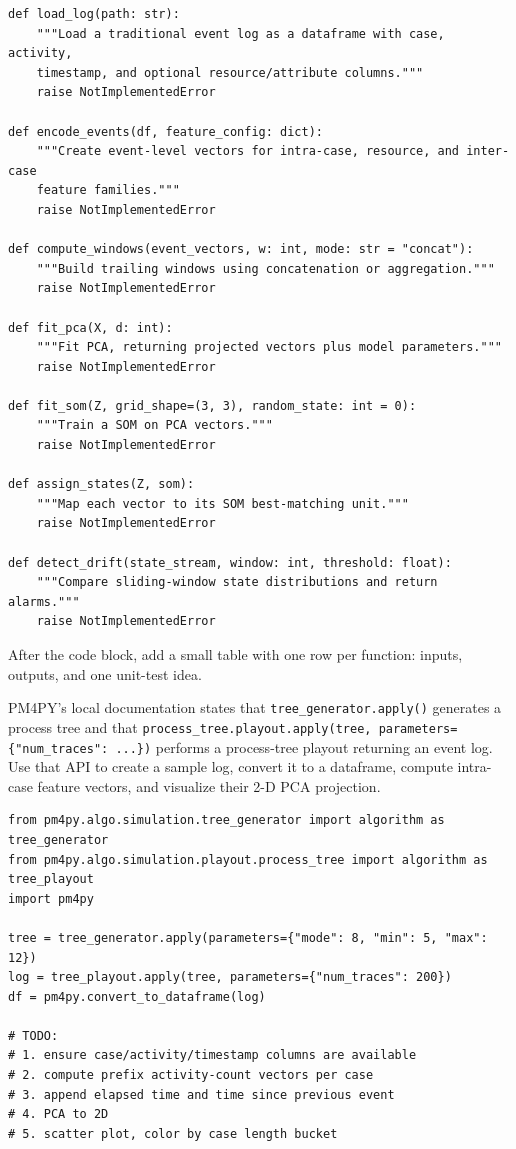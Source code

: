 \documentclass[a4paper,11pt]{article}
\newcounter{task}
\newcommand{\Task}[1]{%
  \refstepcounter{task}%
  \par\medskip
  \noindent{\large\bfseries Task \thetask: #1}\par\smallskip
}
\begin{document}
\begin{lstlisting}[style=python]
def load_log(path: str):
    """Load a traditional event log as a dataframe with case, activity,
    timestamp, and optional resource/attribute columns."""
    raise NotImplementedError

def encode_events(df, feature_config: dict):
    """Create event-level vectors for intra-case, resource, and inter-case
    feature families."""
    raise NotImplementedError

def compute_windows(event_vectors, w: int, mode: str = "concat"):
    """Build trailing windows using concatenation or aggregation."""
    raise NotImplementedError

def fit_pca(X, d: int):
    """Fit PCA, returning projected vectors plus model parameters."""
    raise NotImplementedError

def fit_som(Z, grid_shape=(3, 3), random_state: int = 0):
    """Train a SOM on PCA vectors."""
    raise NotImplementedError

def assign_states(Z, som):
    """Map each vector to its SOM best-matching unit."""
    raise NotImplementedError

def detect_drift(state_stream, window: int, threshold: float):
    """Compare sliding-window state distributions and return alarms."""
    raise NotImplementedError
\end{lstlisting}

After the code block, add a small table with one row per function: inputs, outputs, and one unit-test idea.

\Task{PM4PY intra-case PCA}
PM4PY's local documentation states that \texttt{tree\_generator.apply()} generates a process tree and that \texttt{process\_tree.playout.apply(tree, parameters=\{"num\_traces": ...\})} performs a process-tree playout returning an event log. Use that API to create a sample log, convert it to a dataframe, compute intra-case feature vectors, and visualize their 2-D PCA projection.

\begin{lstlisting}[style=python]
from pm4py.algo.simulation.tree_generator import algorithm as tree_generator
from pm4py.algo.simulation.playout.process_tree import algorithm as tree_playout
import pm4py

tree = tree_generator.apply(parameters={"mode": 8, "min": 5, "max": 12})
log = tree_playout.apply(tree, parameters={"num_traces": 200})
df = pm4py.convert_to_dataframe(log)

# TODO:
# 1. ensure case/activity/timestamp columns are available
# 2. compute prefix activity-count vectors per case
# 3. append elapsed time and time since previous event
# 4. PCA to 2D
# 5. scatter plot, color by case length bucket
\end{lstlisting}
\end{document}
